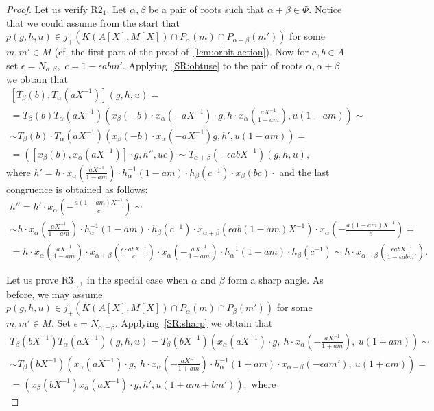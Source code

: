 \documentclass[oneside, 8pt]{amsart}
\theoremstyle{remark}
\theoremstyle{definition}
\numberwithin{equation}{section}
\begin{document}
\begin{proof}
Let us verify $\text{R2}_1$. 
Let $\alpha, \beta$ be a pair of roots such that $\alpha + \beta \in \Phi$.
Notice that we could assume from the start that $p(g, h, u) \in j_+(K(A[X], M[X]) \cap P_\alpha(m) \cap P_{\alpha + \beta}(m'))$ for some $m,m' \in M$ (cf. the first part of the proof of~\cref{lem:orbit-action}).
Now for $a, b \in A$ set $\epsilon = N_{\alpha, \beta},$ $c = 1 - \epsilon abm'$.
Applying~\cref{SR:obtuse} to the pair of roots $\alpha, \alpha+\beta$ we obtain that 
\begin{multline} \nonumber
[T_\beta(b), T_\alpha(aX^{-1})] \left(g, h, u \right) = \\
 = T_\beta(b) T_\alpha(aX^{-1}) \left( x_\beta(-b) \cdot x_\alpha (-a X^{-1}) \cdot g, h \cdot x_\alpha\left(\tfrac{aX^{-1}}{1-am}\right), u (1 - am) \right) \sim \\
 \sim T_\beta(b) \cdot T_\alpha(aX^{-1}) \left( x_\beta(-b) \cdot x_\alpha (-a X^{-1}) g, h', u (1 - am) \right) = \\
 = \left([x_\beta(b), x_\alpha(aX^{-1})]\cdot g, h'', u c\right) \sim T_{\alpha+\beta}(-\epsilon abX^{-1})(g, h, u),\end{multline} 
 where $h' = h\cdot x_\alpha\left(\tfrac{a X^{-1}}{1-am}\right) \cdot h_{\alpha}^{-1}(1-am)\cdot h_{\beta}(c^{-1})\cdot x_{\beta}(bc)\cdot$ 
  and the last congruence is obtained as follows:
 \begin{multline} \nonumber
 h'' = h' \cdot x_\alpha\left(-\tfrac{a(1 - am)X^{-1}}{c}\right) \sim \\ \sim  h\cdot x_\alpha\left(\tfrac{a X^{-1}}{1-am}\right) \cdot h_{\alpha}^{-1}(1-am)\cdot h_{\beta}(c^{-1})\cdot x_{\alpha + \beta}\left(\epsilon ab(1-am)X^{-1}\right)\cdot x_\alpha\left(-\tfrac{a(1 - am)X^{-1}}{c}\right) = \\
 = h\cdot x_\alpha\left(\tfrac{a X^{-1}}{1-am}\right) \cdot x_{\alpha + \beta}\left(\tfrac{\epsilon \cdot abX^{-1}}{c}\right)\cdot x_\alpha\left(-\tfrac{aX^{-1}}{1 - am}\right) \cdot h_{\alpha}^{-1}(1-am)\cdot h_{\beta}(c^{-1}) \sim
 h\cdot x_{\alpha + \beta}\left(\tfrac{\epsilon   abX^{-1}}{1 - \epsilon a b m'}\right).
\end{multline}

Let us prove $\text{R3}_{1,1}$ in the special case when $\alpha$ and $\beta$ form a sharp angle.
As before, we may assume $p(g, h, u) \in j_+(K(A[X], M[X]) \cap P_\alpha(m) \cap P_{\beta}(m'))$ for some $m, m' \in M$.
Set $\epsilon = N_{\alpha,-\beta}$. Applying~\cref{SR:sharp} we obtain that
\begin{multline} \label{eq:sharp-formula1}
 T_\beta(bX^{-1}) T_\alpha(aX^{-1}) \left(g, h, u\right) = 
 T_\beta(bX^{-1}) \left(x_\alpha(aX^{-1})\cdot g,\ h \cdot x_\alpha\left(-\tfrac{aX^{-1}}{1 + am}\right) ,\ u(1 + am)\right) \sim \\ 
 \sim T_\beta(bX^{-1}) \left(x_\alpha(aX^{-1})\cdot g,\ h \cdot x_\alpha\left(-\tfrac{aX^{-1}}{1 + am}\right) \cdot h^{-1}_\alpha(1 + am) \cdot x_{\alpha-\beta}(-\epsilon am'),\ u(1 + am)\right) = \\
 = (x_\beta(bX^{-1}) x_\alpha(aX^{-1}) \cdot g, h', u(1 + am + bm')), \text{ where} \end{multline}
 

\end{proof}
\end{document}
